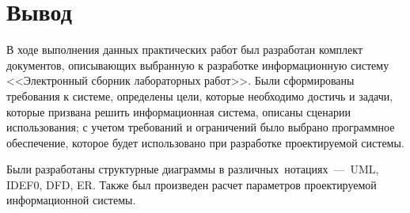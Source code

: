 \documentclass[a4paper,14pt]{extarticle}
\begin{document}
\section{Вывод}

В ходе выполнения данных практических работ был разработан комплект документов, описывающих выбранную к разработке информационную систему <<Электронный сборник лабораторных работ>>. Были сформированы требования к системе, определены цели, которые необходимо достичь и задачи, которые призвана решить информационная система, описаны сценарии использования; с учетом требований и ограничений было выбрано программное обеспечение, которое будет использовано при разработке проектируемой системы.

Были разработаны структурные диаграммы в различных~нотациях~---~UML, IDEF0, DFD, ER. Также был произведен расчет параметров проектируемой информационной системы. 
\end{document}
